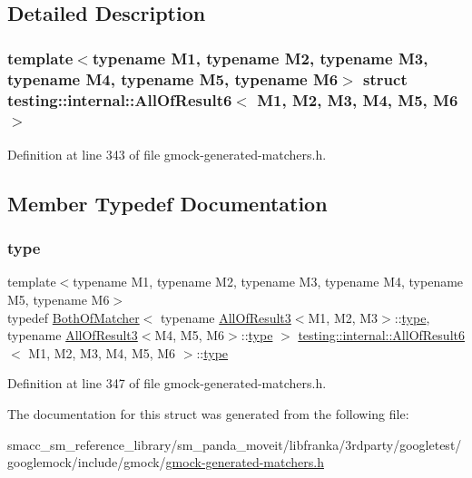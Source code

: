 \subsection{Detailed Description}
\subsubsection*{template$<$typename M1, typename M2, typename M3, typename M4, typename M5, typename M6$>$\newline
struct testing\+::internal\+::\+All\+Of\+Result6$<$ M1, M2, M3, M4, M5, M6 $>$}



Definition at line 343 of file gmock-\/generated-\/matchers.\+h.



\subsection{Member Typedef Documentation}
\mbox{\label{structtesting_1_1internal_1_1AllOfResult6_a5385655911ce2c1d3fccd802c1754139}} 
\subsubsection{\texorpdfstring{type}{type}}
{\footnotesize\ttfamily template$<$typename M1, typename M2, typename M3, typename M4, typename M5, typename M6$>$ \\
typedef \hyperlink{classtesting_1_1internal_1_1BothOfMatcher}{Both\+Of\+Matcher}$<$ typename \hyperlink{structtesting_1_1internal_1_1AllOfResult3}{All\+Of\+Result3}$<$M1, M2, M3$>$\+::\hyperlink{structtesting_1_1internal_1_1AllOfResult6_a5385655911ce2c1d3fccd802c1754139}{type}, typename \hyperlink{structtesting_1_1internal_1_1AllOfResult3}{All\+Of\+Result3}$<$M4, M5, M6$>$\+::\hyperlink{structtesting_1_1internal_1_1AllOfResult6_a5385655911ce2c1d3fccd802c1754139}{type} $>$ \hyperlink{structtesting_1_1internal_1_1AllOfResult6}{testing\+::internal\+::\+All\+Of\+Result6}$<$ M1, M2, M3, M4, M5, M6 $>$\+::\hyperlink{structtesting_1_1internal_1_1AllOfResult6_a5385655911ce2c1d3fccd802c1754139}{type}}



Definition at line 347 of file gmock-\/generated-\/matchers.\+h.



The documentation for this struct was generated from the following file\+:\begin{DoxyCompactItemize}
\item 
smacc\+\_\+sm\+\_\+reference\+\_\+library/sm\+\_\+panda\+\_\+moveit/libfranka/3rdparty/googletest/googlemock/include/gmock/\hyperlink{gmock-generated-matchers_8h}{gmock-\/generated-\/matchers.\+h}\end{DoxyCompactItemize}
